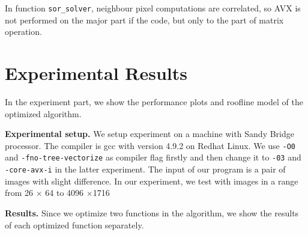 \documentclass[letterpaper]{article}
\newcommand{\mypar}[1]{{\bf #1.}}
\begin{document}
In function \texttt{sor\_solver}, neighbour pixel computations are 
correlated, so AVX is not performed on the major part if the code, but 
only to the part of matrix operation. 

\section{Experimental Results}\label{sec:exp}

In the experiment part, we show the performance plots and roofline model of the optimized algorithm.

\mypar{Experimental setup} We setup experiment on a machine with Sandy Bridge processor. The compiler is gcc with version 4.9.2 on Redhat Linux. We use \texttt{-O0} and \texttt{-fno\allowbreak-tree-vectorize} as compiler flag firstly and then change it to \texttt{-03} and \texttt{-core-avx-i} in the latter experiment. The input of our program is a pair of images with slight difference. In our experiment, we test with images in a range from  26 $\times$ 64 to 4096 $\times$1716

\mypar{Results}
Since we optimize two functions in the algorithm, we show the results of each optimized function separately.
\end{document}

